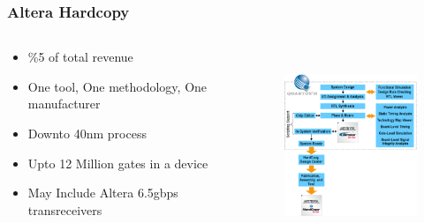 \documentclass{beamer}
\begin{document}
\frame
{
  \frametitle{Altera Hardcopy}
  \begin{columns}
  \begin{column}[l]{6cm}
  \begin{itemize}
  \item \%5 of total revenue
  \item One tool, One methodology, One manufacturer
  \item Downto 40nm process
  \item Upto 12 Million gates in a device
  \item May Include Altera 6.5gbps transreceivers
  \end{itemize}
  \end{column}
  \begin{column}[r]{6cm}
  \begin{figure}[H]
  \includegraphics[height=58mm]{images/altera-hardcopy.eps}
  \end{figure}
  \end{column}
  \end{columns}
}
\end{document}
